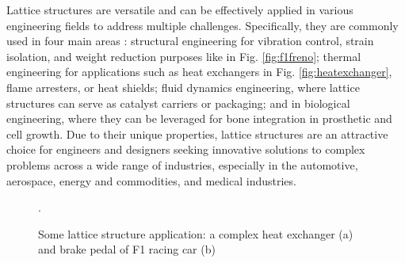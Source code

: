 Lattice structures are versatile and can be effectively applied in various engineering fields to address multiple challenges. Specifically, they are commonly used in four main areas \cite{bhate_classification_2019}: structural engineering for vibration control, strain isolation, and weight reduction purposes like in Fig. \ref{fig:f1freno}; thermal engineering for applications such as heat exchangers in Fig. \ref{fig:heatexchanger}, flame arresters, or heat shields; fluid dynamics engineering, where lattice structures can serve as catalyst carriers or packaging; and in biological engineering, where they can be leveraged for bone integration in prosthetic and cell growth. Due to their unique properties, lattice structures are an attractive choice for engineers and designers seeking innovative solutions to complex problems across a wide range of industries, especially in the automotive, aerospace, energy and commodities, and medical industries.
\begin{figure}
    \centering
    \qquad
    \caption[Lattice structure applications.]{Some lattice structure application: a complex heat exchanger (a) and brake pedal of F1 racing car (b) \cite{milewski_additive_2017, du_plessis_beautiful_2019}}.
\end{figure}
